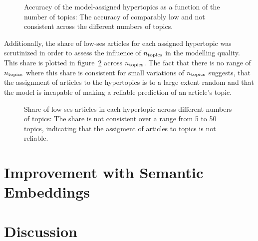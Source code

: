 \begin{figure}
    \centering
    \caption{Accuracy of the model-assigned hypertopics as a function of the number of topics: The accuracy of comparably low and not consistent across the different numbers of topics.}\label{fig:accuracy_by_ntopics}
\end{figure}

Additionally, the share of low-\gls{ses} articles for each assigned hypertopic was scrutinized in order to assess the influence of $n_\text{topics}$ in the modelling quality. This share is plotted in figure~\ref{fig:lowshare_per_ntopics} across $n_\text{topics}$. The fact that there is no range of $n_\text{topics}$ where this share is consistent for small variations of $n_\text{topics}$ suggests, that the assignment of articles to the hypertopics is to a large extent random and that the model is incapable of making a reliable prediction of an article's topic.

\begin{figure}
    \centering
    \caption{Share of low-\gls{ses} articles in each hypertopic across different numbers of topics: The share is not consistent over a range from \SI{5}{} to \SI{50}{} topics, indicating that the assigment of articles to topics is not reliable.}\label{fig:lowshare_per_ntopics}
\end{figure}







\section{Improvement with Semantic Embeddings}

\section{Discussion}